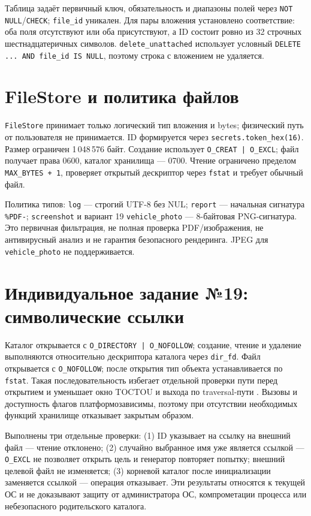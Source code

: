 \documentclass[12pt,a4paper]{article}
\begin{document}
Таблица задаёт первичный ключ, обязательность и диапазоны полей через \texttt{NOT NULL}/\texttt{CHECK}; \texttt{file\_id} уникален. Для пары вложения установлено соответствие: оба поля отсутствуют или оба присутствуют, а ID состоит ровно из 32 строчных шестнадцатеричных символов. \texttt{delete\_unattached} использует условный \texttt{DELETE ... AND file\_id IS NULL}, поэтому строка с вложением не удаляется.

\section{FileStore и политика файлов}
\texttt{FileStore} принимает только логический тип вложения и bytes; физический путь от пользователя не принимается. ID формируется через \texttt{secrets.token\_hex(16)}. Размер ограничен 1\,048\,576 байт. Создание использует \texttt{O\_CREAT | O\_EXCL}; файл получает права 0600, каталог хранилища — 0700. Чтение ограничено пределом \texttt{MAX\_BYTES + 1}, проверяет открытый дескриптор через \texttt{fstat} и требует обычный файл.

Политика типов: \texttt{log} — строгий UTF-8 без NUL; \texttt{report} — начальная сигнатура \texttt{\%PDF-}; \texttt{screenshot} и вариант 19 \texttt{vehicle\_photo} — 8-байтовая PNG-сигнатура. Это первичная фильтрация, не полная проверка PDF/изображения, не антивирусный анализ и не гарантия безопасного рендеринга. JPEG для \texttt{vehicle\_photo} не поддерживается.

\section{Индивидуальное задание №19: символические ссылки}
Каталог открывается с \texttt{O\_DIRECTORY | O\_NOFOLLOW}; создание, чтение и удаление выполняются относительно дескриптора каталога через \texttt{dir\_fd}. Файл открывается с \texttt{O\_NOFOLLOW}; после открытия тип объекта устанавливается по \texttt{fstat}. Такая последовательность избегает отдельной проверки пути перед открытием и уменьшает окно TOCTOU и выхода по traversal-пути \cite{pythonOs,cwe22,cwe367}. Вызовы и доступность флагов платформозависимы, поэтому при отсутствии необходимых функций хранилище отказывает закрытым образом.

Выполнены три отдельные проверки: (1) ID указывает на ссылку на внешний файл — чтение отклонено; (2) случайно выбранное имя уже является ссылкой — \texttt{O\_EXCL} не позволяет открыть цель и генератор повторяет попытку; внешний целевой файл не изменяется; (3) корневой каталог после инициализации заменяется ссылкой — операция отказывает. Эти результаты относятся к текущей ОС и не доказывают защиту от администратора ОС, компрометации процесса или небезопасного родительского каталога.
\end{document}
